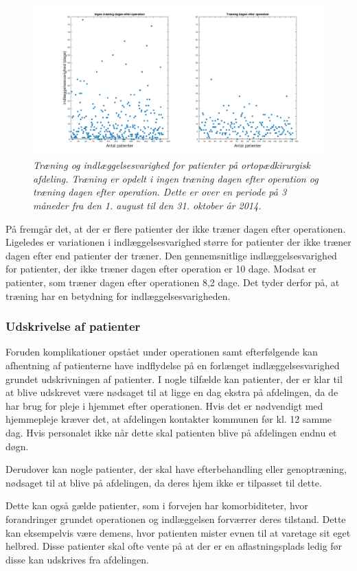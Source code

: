 \begin{figure}[H]
	\centering
	\includegraphics[scale=0.35]{figures/traeningindlaeg.png}
	\caption{\textit{Træning og indlæggelsesvarighed for patienter på ortopædkirurgisk afdeling. Træning er opdelt i ingen træning dagen efter operation og træning dagen efter operation. Dette er over en periode på 3 måneder fra den 1. august til den 31. oktober år 2014.}}
	\label{traeningindlaeg}
	\end{figure}

\noindent
På  fremgår det, at der er flere patienter  der ikke træner dagen efter operationen. Ligeledes er variationen i indlæggelsesvarighed større for patienter der ikke træner dagen efter end patienter der træner. Den gennemsnitlige indlæggelsesvarighed for patienter, der ikke træner dagen efter operation er 10 dage. Modsat er patienter, som træner dagen efter operationen 8,2 dage. Det tyder derfor på, at træning har en betydning for indlæggelsesvarigheden. 


\subsubsection{Udskrivelse af patienter}
Foruden komplikationer opstået under operationen samt efterfølgende kan afhentning af patienterne have indflydelse på en forlænget indlæggelsesvarighed grundet udskrivningen af patienter. I nogle tilfælde kan patienter, der er klar til at blive udskrevet være nødsaget til at ligge en dag ekstra på afdelingen, da de har brug for pleje i hjemmet efter operationen. Hvis det er nødvendigt med hjemmepleje kræver det, at afdelingen kontakter kommunen før kl. 12 samme dag. Hvis personalet ikke når dette skal patienten blive på afdelingen endnu et døgn. 

Derudover kan nogle patienter, der skal have efterbehandling eller genoptræning,  nødsaget til at blive på afdelingen, da deres hjem ikke er tilpasset til dette. 

Dette kan også gælde patienter, som i forvejen har komorbiditeter, hvor forandringer grundet operationen og indlæggelsen forværrer deres tilstand. Dette kan eksempelvis være demens, hvor patienten mister evnen til at varetage sit eget helbred. Disse patienter skal ofte vente på at der er en aflastningsplads ledig før disse kan udskrives fra afdelingen. 



